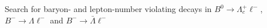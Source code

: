 Search for baryon- and lepton-number violating decays in
$B^0\rightarrow\Lambda_c^+\ell^-$, $B^-\rightarrow\Lambda\ell^-$
and $B^-\rightarrow\bar{\Lambda}\ell^-$
